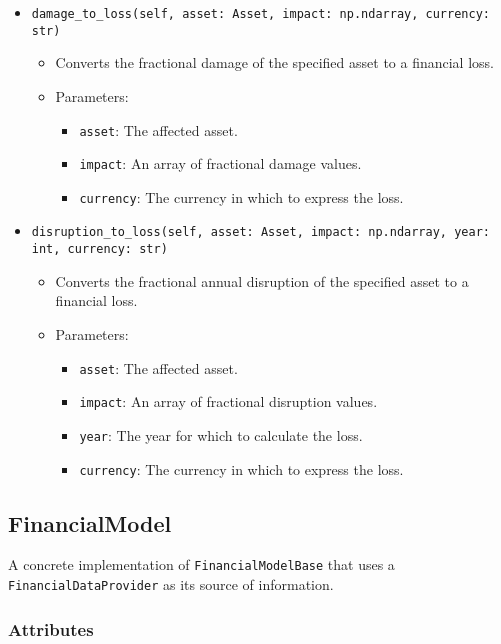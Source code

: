 \documentclass{article}
\begin{document}
\begin{itemize}
    \item \texttt{damage\_to\_loss(self, asset: Asset, impact: np.ndarray, currency: str)}
    \begin{itemize}
        \item Converts the fractional damage of the specified asset to a financial loss.
        \item Parameters:
        \begin{itemize}
            \item \texttt{asset}: The affected asset.
            \item \texttt{impact}: An array of fractional damage values.
            \item \texttt{currency}: The currency in which to express the loss.
        \end{itemize}
    \end{itemize}

    \item \texttt{disruption\_to\_loss(self, asset: Asset, impact: np.ndarray, year: int, currency: str)}
    \begin{itemize}
        \item Converts the fractional annual disruption of the specified asset to a financial loss.
        \item Parameters:
        \begin{itemize}
            \item \texttt{asset}: The affected asset.
            \item \texttt{impact}: An array of fractional disruption values.
            \item \texttt{year}: The year for which to calculate the loss.
            \item \texttt{currency}: The currency in which to express the loss.
        \end{itemize}
    \end{itemize}
\end{itemize}

\subsection{FinancialModel}

A concrete implementation of \texttt{FinancialModelBase} that uses a \texttt{FinancialDataProvider} as its source of information.

\subsubsection{Attributes}
\end{document}
